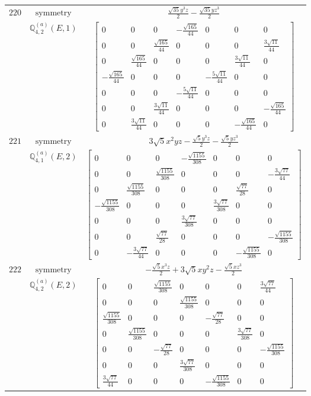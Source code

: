 \documentclass[fleqn,8pt,landscape]{jsarticle}
\begin{document}
\begin{longtable}{ccc}
$ 220 $ & $ \text{symmetry} $ & $ \frac{\sqrt{35} y^{3} z}{2} - \frac{\sqrt{35} y z^{3}}{2} $ \\
$  $ & $ \mathbb{Q}_{4,2}^{(a)}(E,1) $ & $ \begin{bmatrix} 0 & 0 & 0 & - \frac{\sqrt{165}}{44} & 0 & 0 & 0 \\ 0 & 0 & \frac{\sqrt{165}}{44} & 0 & 0 & 0 & \frac{3 \sqrt{11}}{44} \\ 0 & \frac{\sqrt{165}}{44} & 0 & 0 & 0 & \frac{3 \sqrt{11}}{44} & 0 \\ - \frac{\sqrt{165}}{44} & 0 & 0 & 0 & - \frac{5 \sqrt{11}}{44} & 0 & 0 \\ 0 & 0 & 0 & - \frac{5 \sqrt{11}}{44} & 0 & 0 & 0 \\ 0 & 0 & \frac{3 \sqrt{11}}{44} & 0 & 0 & 0 & - \frac{\sqrt{165}}{44} \\ 0 & \frac{3 \sqrt{11}}{44} & 0 & 0 & 0 & - \frac{\sqrt{165}}{44} & 0 \end{bmatrix} $ \\ \hline
$ 221 $ & $ \text{symmetry} $ & $ 3 \sqrt{5} x^{2} y z - \frac{\sqrt{5} y^{3} z}{2} - \frac{\sqrt{5} y z^{3}}{2} $ \\
$  $ & $ \mathbb{Q}_{4,1}^{(a)}(E,2) $ & $ \begin{bmatrix} 0 & 0 & 0 & - \frac{\sqrt{1155}}{308} & 0 & 0 & 0 \\ 0 & 0 & \frac{\sqrt{1155}}{308} & 0 & 0 & 0 & - \frac{3 \sqrt{77}}{44} \\ 0 & \frac{\sqrt{1155}}{308} & 0 & 0 & 0 & \frac{\sqrt{77}}{28} & 0 \\ - \frac{\sqrt{1155}}{308} & 0 & 0 & 0 & \frac{3 \sqrt{77}}{308} & 0 & 0 \\ 0 & 0 & 0 & \frac{3 \sqrt{77}}{308} & 0 & 0 & 0 \\ 0 & 0 & \frac{\sqrt{77}}{28} & 0 & 0 & 0 & - \frac{\sqrt{1155}}{308} \\ 0 & - \frac{3 \sqrt{77}}{44} & 0 & 0 & 0 & - \frac{\sqrt{1155}}{308} & 0 \end{bmatrix} $ \\ \hline
$ 222 $ & $ \text{symmetry} $ & $ - \frac{\sqrt{5} x^{3} z}{2} + 3 \sqrt{5} x y^{2} z - \frac{\sqrt{5} x z^{3}}{2} $ \\
$  $ & $ \mathbb{Q}_{4,2}^{(a)}(E,2) $ & $ \begin{bmatrix} 0 & 0 & \frac{\sqrt{1155}}{308} & 0 & 0 & 0 & \frac{3 \sqrt{77}}{44} \\ 0 & 0 & 0 & \frac{\sqrt{1155}}{308} & 0 & 0 & 0 \\ \frac{\sqrt{1155}}{308} & 0 & 0 & 0 & - \frac{\sqrt{77}}{28} & 0 & 0 \\ 0 & \frac{\sqrt{1155}}{308} & 0 & 0 & 0 & \frac{3 \sqrt{77}}{308} & 0 \\ 0 & 0 & - \frac{\sqrt{77}}{28} & 0 & 0 & 0 & - \frac{\sqrt{1155}}{308} \\ 0 & 0 & 0 & \frac{3 \sqrt{77}}{308} & 0 & 0 & 0 \\ \frac{3 \sqrt{77}}{44} & 0 & 0 & 0 & - \frac{\sqrt{1155}}{308} & 0 & 0 \end{bmatrix} $ \\ \hline

\end{longtable}
\end{document}
